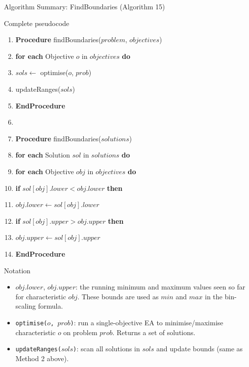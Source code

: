 \documentclass[aspectratio=169,10pt]{beamer}
\begin{document}
\begin{frame}[allowframebreaks]{Algorithm Summary: FindBoundaries (Algorithm 15)}

\begin{block}{Complete pseudocode}
\begin{enumerate}
  \item[] \textbf{Procedure} findBoundaries($problem$, $objectives$)
  \item \textbf{for each} Objective $o$ in $objectives$ \textbf{do}
  \item \quad $sols \leftarrow$ optimise($o$, $prob$)
  \item \quad updateRanges($sols$)
  \item[] \textbf{EndProcedure}
  \item[]
  \item[] \textbf{Procedure} findBoundaries($solutions$)
  \item \textbf{for each} Solution $sol$ in $solutions$ \textbf{do}
  \item \quad \textbf{for each} Objective $obj$ in $objectives$ \textbf{do}
  \item \quad\quad \textbf{if} $sol[obj].lower < obj.lower$ \textbf{then}
  \item \quad\quad\quad $obj.lower \leftarrow sol[obj].lower$
  \item \quad\quad \textbf{if} $sol[obj].upper > obj.upper$ \textbf{then}
  \item \quad\quad\quad $obj.upper \leftarrow sol[obj].upper$
  \item[] \textbf{EndProcedure}
\end{enumerate}
\end{block}

\medskip
\begin{block}{Notation}
\begin{itemize}
  \item $obj.lower$, $obj.upper$: the running minimum and maximum
        values seen so far for characteristic $obj$.
        These bounds are used as $min$ and $max$ in the bin-scaling
        formula.
  \item \texttt{optimise($o$, $prob$)}: run a single-objective EA
        to minimise/maximise characteristic $o$ on problem $prob$.
        Returns a set of solutions.
  \item \texttt{updateRanges($sols$)}: scan all solutions in $sols$
        and update bounds (same as Method 2 above).
\end{itemize}
\end{block}

\end{frame}
\end{document}
